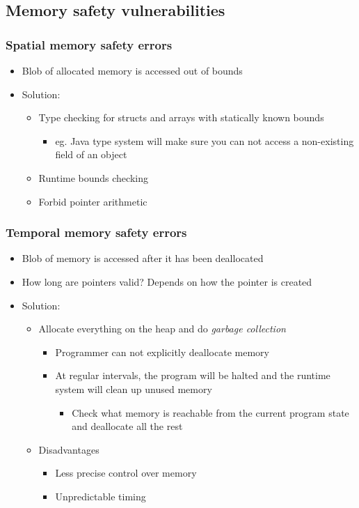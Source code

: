 \documentclass[12pt,titlepage,a4paper]{report}
\begin{document}
	\subsection{Memory safety vulnerabilities}
	\subsubsection{Spatial memory safety errors}
	\begin{itemize}
		\item Blob of allocated memory is accessed out of bounds
		\item Solution:
		\begin{itemize}
			\item Type checking for structs and arrays with statically known bounds 
			\begin{itemize}
				\item eg. Java type system will make sure you can not access a non-existing field of an object
			\end{itemize}
			\item Runtime bounds checking
			\item Forbid pointer arithmetic
		\end{itemize}
	\end{itemize}

	\subsubsection{Temporal memory safety errors}
	\begin{itemize}
		\item Blob of memory is accessed after it has been deallocated
		\item How long are pointers valid?
			\subitem Depends on how the pointer is created
		\item Solution:
		\begin{itemize}
			\item Allocate everything on the heap and do \emph{garbage collection}
			\begin{itemize}
				\item Programmer can not explicitly deallocate memory
				\item At regular intervals, the program will be halted and the runtime system will clean up unused memory
				\begin{itemize}
					\item Check what memory is reachable from the current program state and deallocate all the rest
				\end{itemize}
			\end{itemize}
			\item Disadvantages
			\begin{itemize}
				\item Less precise control over memory
				\item Unpredictable timing
			\end{itemize}
		\end{itemize}
	\end{itemize}
	
\end{document}
